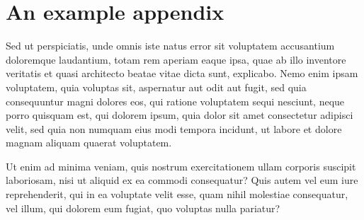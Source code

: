 \chapter{An example appendix}

Sed ut perspiciatis, unde omnis iste natus error sit
voluptatem accusantium doloremque laudantium, totam rem aperiam eaque ipsa,
quae ab illo inventore veritatis et quasi architecto beatae vitae dicta sunt,
explicabo. Nemo enim ipsam voluptatem, quia voluptas sit, aspernatur aut odit
aut fugit, sed quia consequuntur magni dolores eos, qui ratione voluptatem
sequi nesciunt, neque porro quisquam est, qui dolorem ipsum, quia dolor sit
amet consectetur adipisci velit, sed quia non numquam eius modi tempora
incidunt, ut labore et dolore magnam aliquam quaerat voluptatem.

Ut enim ad minima veniam, quis nostrum exercitationem ullam corporis suscipit
laboriosam, nisi ut aliquid ex ea commodi consequatur? Quis autem vel eum iure
reprehenderit, qui in ea voluptate velit esse, quam nihil molestiae
consequatur, vel illum, qui dolorem eum fugiat, quo voluptas nulla pariatur?
